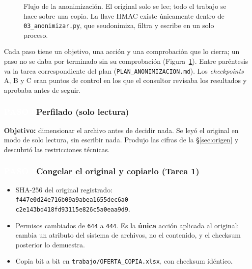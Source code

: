 \documentclass[11pt,a4paper,twoside,twocolumn]{article}
\newcommand{\cod}[1]{\nolinkurl{#1}}
\newcommand{\paso}[2]{\subsubsection*{\colorbox{ustaAzul}{\textcolor{white}{\scriptsize\sffamily\bfseries PASO #1}}\enspace #2}}
\begin{document}
\begin{figure}[tp]
\caption{Flujo de la anonimización. El original solo se lee; todo el trabajo se hace sobre una
copia. La llave HMAC existe únicamente dentro de \texttt{03\_anonimizar.py}, que seudonimiza,
filtra y escribe en un solo proceso.}
\label{fig:flujo}
\end{figure}

Cada paso tiene un objetivo, una acción y una comprobación que lo cierra; un paso no se daba por
terminado sin su comprobación (Figura~\ref{fig:flujo}). Entre paréntesis va la tarea
correspondiente del plan (\cod{PLAN_ANONIMIZACION.md}). Los \emph{checkpoints} A, B y C eran
puntos de control en los que el consultor revisaba los resultados y aprobaba antes de seguir.

\paso{0}{Perfilado (solo lectura)}

\textbf{Objetivo:} dimensionar el archivo antes de decidir nada. Se leyó el original en modo de
solo lectura, sin escribir nada. Produjo las cifras de la §\ref{sec:origen} y descubrió las
restricciones técnicas.

\paso{1}{Congelar el original y copiarlo (Tarea 1)}

\begin{itemize}[leftmargin=*,itemsep=2pt,topsep=0pt]
  \item SHA-256 del original registrado:\\
  {\scriptsize\texttt{f447e0d24e716b09a9abea1655dec6a0\\c2e143bd418fd93115e826c5a0eaa9d9}}.
  \item Permisos cambiados de \cod{644} a \cod{444}. Es la \textbf{única} acción aplicada al
  original: cambia un atributo del sistema de archivos, no el contenido, y el checksum posterior
  lo demuestra.
  \item Copia bit a bit en \cod{trabajo/OFERTA_COPIA.xlsx}, con checksum idéntico.
\end{itemize}
\end{document}
